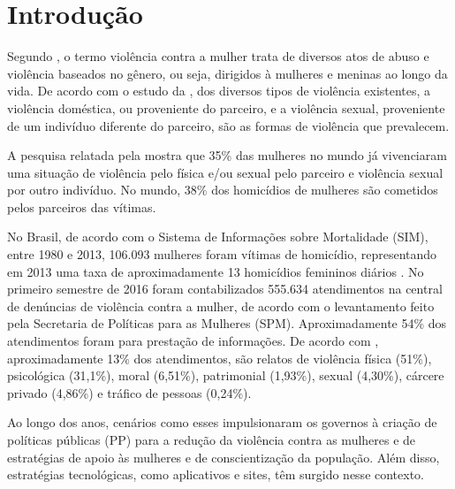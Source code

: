 \chapter[Introdução]{Introdução} \label{cap:introducao}

Segundo , o termo violência contra a mulher trata de
diversos atos de abuso e violência baseados no gênero, ou seja, dirigidos à mulheres e meninas ao longo da vida.
De acordo com o estudo da , dos diversos tipos de violência existentes, a violência doméstica, ou proveniente do parceiro,
e a violência sexual, proveniente de um indivíduo diferente do parceiro, são as formas de violência que prevalecem.

A pesquisa relatada pela  mostra que 35\% das mulheres no mundo já vivenciaram uma situação
de violência pelo física e/ou sexual pelo parceiro e violência sexual por outro indivíduo. No mundo, 38\% dos homicídios de mulheres são cometidos pelos parceiros das vítimas.

No Brasil, de acordo com o Sistema de Informações sobre Mortalidade (SIM), entre 1980 e 2013, 106.093 mulheres foram vítimas de homicídio, representando em 2013 uma taxa de aproximadamente 13 homicídios femininos
diários \cite{mapa_violencia_2015}. 
No primeiro semestre de 2016 foram contabilizados 555.634 atendimentos na central de denúncias 
de violência contra a mulher, de acordo com o levantamento feito pela Secretaria de Políticas para as Mulheres (SPM). 
Aproximadamente 54\% dos atendimentos foram para prestação de informações. De acordo com \cite{portal_180}, aproximadamente 13\% dos atendimentos, são relatos de violência física (51\%), psicológica (31,1\%), moral (6,51\%), patrimonial (1,93\%), sexual (4,30\%), cárcere privado (4,86\%) e tráfico de pessoas (0,24\%).

Ao longo dos anos, cenários como esses impulsionaram os governos à criação de políticas públicas (PP) para a redução da violência contra as mulheres e de estratégias de apoio às mulheres e de conscientização da população. Além disso, estratégias tecnológicas, como aplicativos e sites, têm surgido nesse contexto.


